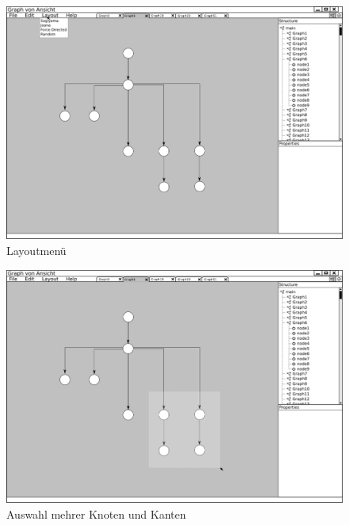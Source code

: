 \begin{figure}[ht]
  \centering
  \includegraphics[width=380pt]{resourcen/gui_view_layoutmenu.png}
  \caption{Layoutmenü}
  \label{fig:gui_view_layoutmenu}
\end{figure}

\begin{figure}[hb]
  \centering
  \includegraphics[width=380pt]{resourcen/gui_view_drawSelection.png}
  \caption{Auswahl mehrer Knoten und Kanten}
  \label{fig:gui_view_drawSelection}
\end{figure}

